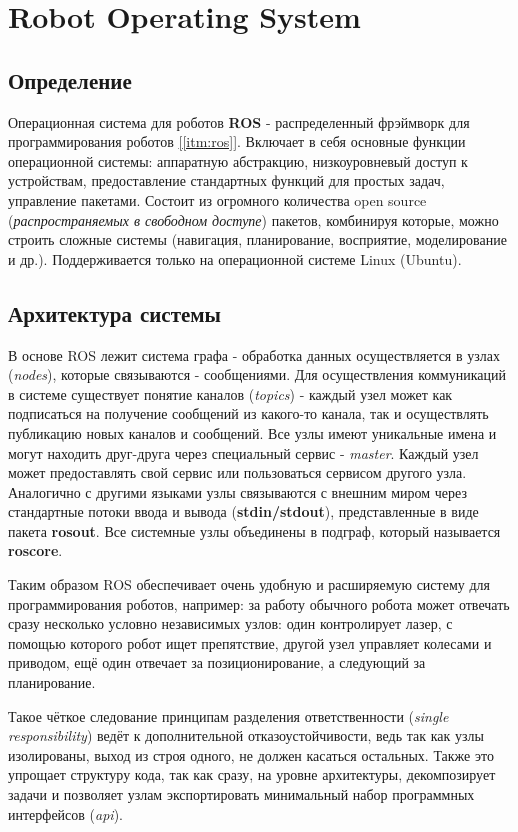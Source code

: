\chapter{Robot Operating System}

\section{Определение}

Операционная система для роботов \textbf{ROS} - распределенный фрэймворк для программирования роботов \hyperref[itm:ros]{[\ref{itm:ros}]}. Включает в себя основные функции операционной системы: аппаратную абстракцию, низкоуровневый доступ к устройствам, предоставление стандартных функций для простых задач, управление пакетами. Состоит из огромного количества open source (\textit{распространяемых в свободном доступе}) пакетов, комбинируя которые, можно строить сложные системы (навигация, планирование, восприятие, моделирование и др.). Поддерживается только на операционной системе Linux (Ubuntu).

\section{Архитектура системы}

В основе ROS лежит система графа - обработка данных осуществляется в узлах (\textit{nodes}), которые связываются  - сообщениями. Для осуществления коммуникаций в системе существует понятие каналов (\textit{topics}) - каждый узел может как подписаться на получение сообщений из какого-то канала, так и осуществлять публикацию новых каналов и сообщений. Все узлы имеют уникальные имена и могут находить друг-друга через специальный сервис - \textit{master}. Каждый узел может предоставлять свой сервис или пользоваться сервисом другого узла. Аналогично с другими языками узлы связываются с внешним миром через стандартные потоки ввода и вывода (\textbf{stdin/stdout}), представленные в виде пакета \textbf{rosout}. Все системные узлы объединены в подграф, который называется \textbf{roscore}.

Таким образом ROS обеспечивает очень удобную и расширяемую систему для программирования роботов, например: за работу обычного робота может отвечать сразу несколько условно независимых узлов: один контролирует лазер, с помощью которого робот ищет препятствие, другой узел управляет колесами и приводом, ещё один отвечает за позиционирование, а следующий за планирование.

Такое чёткое следование принципам разделения ответственности (\textit{single responsibility}) ведёт к дополнительной отказоустойчивости, ведь так как узлы изолированы, выход из строя одного, не должен касаться остальных. Также это упрощает структуру кода, так как сразу, на уровне архитектуры, декомпозирует задачи и позволяет узлам экспортировать минимальный набор программных интерфейсов (\textit{api}).

